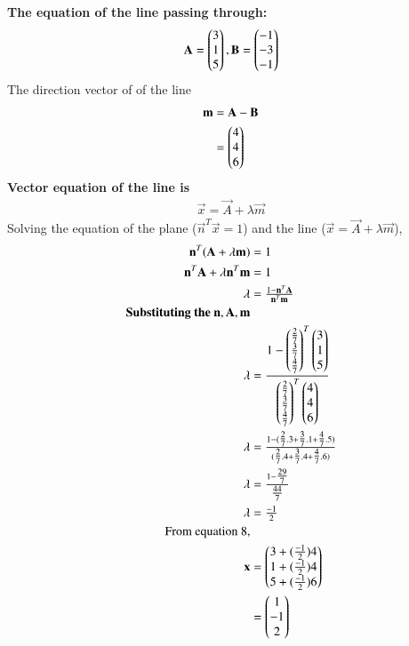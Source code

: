 \documentclass[journal]{IEEEtran}
\begin{document}
\textbf{The equation of the line passing through:}\\
\begin{align}
\mathbf{A}=\begin{pmatrix}3\\1\\5\end{pmatrix},\mathbf{B}=\begin{pmatrix}-1\\-3\\-1\end{pmatrix}\\
\end{align}
The direction vector of of the line
\begin{align}
\mathbf{m}&=\mathbf{A}-\mathbf{B}\\
&=\begin{pmatrix}4\\4\\6\end{pmatrix}
\end{align}
\textbf{Vector equation of the line is}
\begin{align}
\vec{x}=\vec{A}+\lambda\vec{m}
\end{align}
Solving the equation of the plane ($\vec{n}^{T}\vec{x}=1$) and the line ($\vec{x}=\vec{A}+\lambda\vec{m}$),
\begin{align}
\mathbf{n}^{T}(\mathbf{A}+\lambda\mathbf{m})&=1\\
\mathbf{n}^{T}\mathbf{A}+\lambda\mathbf{n}^{T}\mathbf{m}&=1\\
\lambda&=\tfrac{1-\mathbf{n}^{T}\mathbf{A}}{\mathbf{n}^{T}\mathbf{m}}\\
\textbf{Substituting the $\mathbf{n},\mathbf{A},\mathbf{m}$}\\
\lambda&=\dfrac{1-\begin{pmatrix}\tfrac{2}{7}\\\tfrac{3}{7} \\\tfrac{4}{7}\end{pmatrix}^{T}\begin{pmatrix}3\\1\\5\end{pmatrix}}{\begin{pmatrix}\tfrac{2}{7}\\\tfrac{3}{7} \\\tfrac{4}{7}\end{pmatrix}^{T}\begin{pmatrix}4\\4\\6\end{pmatrix}}\\
\lambda&=\tfrac{1-(\tfrac{2}{7}.3+\tfrac{3}{7}.1+\tfrac{4}{7}.5)}{(\tfrac{2}{7}.4+\tfrac{3}{7}.4+\tfrac{4}{7}.6)}\\
\lambda&=\tfrac{1-\tfrac{29}{7}}{\tfrac{44}{7}}\\
\lambda&=\tfrac{-1}{2}\\
\text{From equation 8,}\\
\mathbf{x}&=\begin{pmatrix}3+(\tfrac{-1}{2})4\\1+(\tfrac{-1}{2})4\\5+(\tfrac{-1}{2})6\end{pmatrix}\\
&=\begin{pmatrix}1\\-1\\2\end{pmatrix}
\end{align}
\end{document}
